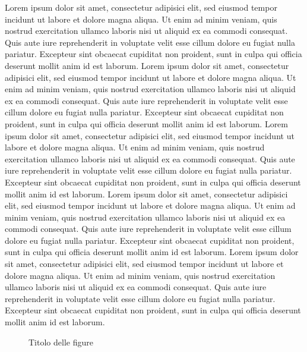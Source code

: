 Lorem ipsum dolor sit amet, consectetur adipisici elit, sed eiusmod tempor incidunt ut labore et dolore magna aliqua.
 Ut enim ad minim veniam, quis nostrud exercitation ullamco laboris nisi ut aliquid ex ea commodi consequat. Quis aute
 iure reprehenderit in voluptate velit esse cillum dolore eu fugiat nulla pariatur. Excepteur sint obcaecat cupiditat
 non proident, sunt in culpa qui officia deserunt mollit anim id est laborum.
Lorem ipsum dolor sit amet, consectetur adipisici elit, sed eiusmod tempor incidunt ut labore et dolore magna aliqua.
 Ut enim ad minim veniam, quis nostrud exercitation ullamco laboris nisi ut aliquid ex ea commodi consequat. Quis aute
 iure reprehenderit in voluptate velit esse cillum dolore eu fugiat nulla pariatur. Excepteur sint obcaecat cupiditat
 non proident, sunt in culpa qui officia deserunt mollit anim id est laborum.
Lorem ipsum dolor sit amet, consectetur adipisici elit, sed eiusmod tempor incidunt ut labore et dolore magna aliqua.
 Ut enim ad minim veniam, quis nostrud exercitation ullamco laboris nisi ut aliquid ex ea commodi consequat. Quis aute
 iure reprehenderit in voluptate velit esse cillum dolore eu fugiat nulla pariatur. Excepteur sint obcaecat cupiditat
 non proident, sunt in culpa qui officia deserunt mollit anim id est laborum.
Lorem ipsum dolor sit amet, consectetur adipisici elit, sed eiusmod tempor incidunt ut labore et dolore magna aliqua.
 Ut enim ad minim veniam, quis nostrud exercitation ullamco laboris nisi ut aliquid ex ea commodi consequat. Quis aute
 iure reprehenderit in voluptate velit esse cillum dolore eu fugiat nulla pariatur. Excepteur sint obcaecat cupiditat
 non proident, sunt in culpa qui officia deserunt mollit anim id est laborum.
Lorem ipsum dolor sit amet, consectetur adipisici elit, sed eiusmod tempor incidunt ut labore et dolore magna aliqua.
 Ut enim ad minim veniam, quis nostrud exercitation ullamco laboris nisi ut aliquid ex ea commodi consequat. Quis aute
 iure reprehenderit in voluptate velit esse cillum dolore eu fugiat nulla pariatur. Excepteur sint obcaecat cupiditat
 non proident, sunt in culpa qui officia deserunt mollit anim id est laborum.

\begin{figure}[!ht]
\centering
{}
\caption {Titolo delle figure}
\end{figure}



